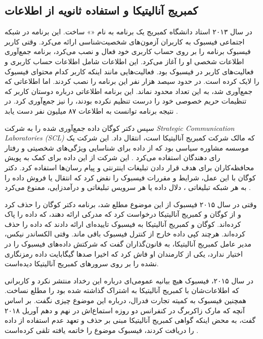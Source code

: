 \subsection*{کمبریج آنالیتیکا و استفاده ثانویه از اطلاعات}
در سال ۲۰۱۳ استاد دانشگاه کمبریج یک برنامه به نام
«»
ساخت. این برنامه در شبکه اجتماعی فیسبوک به کاربران
آزمون‌های شخصیت‌شناسی ارائه می‌کرد. وقتی کاربر فیسبوک برنامه را بر روی حساب کاربری خود فعال و نصب
می‌کرد، برنامه جمع‌آوری اطلاعات شخصی او را آغاز می‌کرد. این اطلاعات شامل اطلاعات حساب کاربری و فعالیت‌های کاربر در فیسبوک
بود. فعالیت‌هایی مانند اینکه کاربر کدام محتوای فیسبوک را لایک کرده است. در حدود سیصد هزار نفر این
برنامه را نصب کردند. اما اطلاعاتی که جمع‌آوری شد، به این تعداد محدود نماند.
این برنامه اطلاعاتی درباره دوستان کاربر که تنظیمات حریم خصوصی خود را درست  تنظیم نکرده بودند، را
نیز جمع‌آوری کرد. در نتیجه برنامه توانست به اطلاعات ۸۷ میلیون نفر دست یابد
\!\citep{kangFacebookSaysCambridge}.

سپس دکتر کوگان داده جمع‌آوری شده را به شرکت
\textit{
  \gls{ Strategic Communication Laboratories (SCL)}
}
که مالک شرکت کمبریج آنالیتیکا است، انتقال داد. این شرکت یک موسسه مشاوره
سیاسی بود که از داده برای شناسایی ویژگی‌های شخصیتی و رفتار رای دهندگان
استفاده می‌کرد
\!\citep{rosenbergHowTrumpConsultants2018}.
این شرکت از این داده برای کمک به پویش محافظه‌کاران برای هدف
قرار دادن تبلیغات اینترنتی و پیام رسان‌ها استفاده کرد. دکتر کوگان با این عمل، شرایط و مقررات فیسبوک را نقض کرد که انتقال یا
فروش داده را به هر شبکه تبلیغاتی ، دلال داده یا هر سرویس تبلیغاتی
و درآمد‌زایی، ممنوع می‌کرد
\!\citep{granvilleFacebookCambridgeAnalytica2018}.

وقتی در سال ۲۰۱۵ فیسبوک از این موضوع مطلع شد، برنامه دکتر کوگان
را حذف  کرد و از کوگان و کمبریج آنالیتیکا درخواست کرد که
مدرکی ارائه دهند، که داده را پاک کرده‌اند. کوگان و کمبریج آنالیتیکا
به فیسبوک تاییده‌ای ارائه دادند که داده را حذف کرده‌اند. هرچند  کپی داده
خارج از کنترل فیسبوک باقی ماند.  وقتی الکساندر نیکس، مدیر عامل
کمبریج آنالیتیکا، به قانون‌گذاران گفت که شرکتش داده‌های فیسبوک را در
اختیار ندارد، یکی از کارمندان او فاش کرد که اخیرا صدها گیگابایت داده رمزنگاری نشده را
بر روی سرورهای کمبریج آنالیتیکا دیده‌است.

در سال ۲۰۱۵، فیسبوک هیچ بیانیه عمومی‌ای درباره این رخداد منتشر نکرد و
کاربرانی که اطلاعات‌شان با کمبریج آنالیتیکا به اشتراک گذاشته شده
بود را مطلع نساخت. همچنین فیسبوک به کمیته تجارت فدرال، درباره این موضوع
چیزی نگفت. بر اساس آنچه که مارک زاکربرگ در کنفرانس دو روزه
استماع‌اش در نهم و دهم آوریل ۲۰۱۸ گفت، به محض اینکه گواهی کمبریج آنالیتیکا
مبنی بر حذف و تعهد عدم استفاده از داده را دریافت کردند، فیسبوک
موضوع را خاتمه یافته تلقی کرده‌است
\!\citep{spanFacebookCEOMark}.

